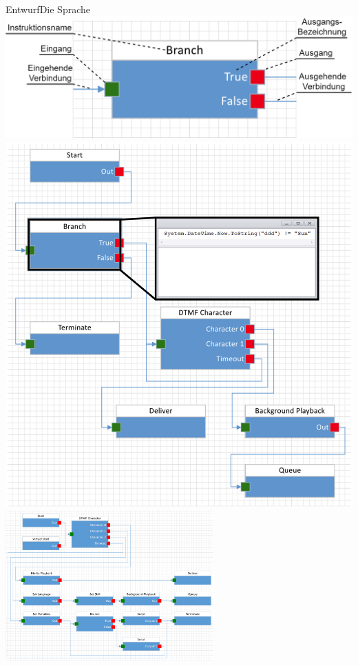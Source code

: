 \documentclass[t,aspectratio=169,divpsnames]{beamer}
\begin{document}
\begin{frame}{Entwurf}{Die Sprache}
	\only<1>
	{	
		\center
		\includegraphics[width=\textwidth]{img/SingleNodeWithAnnotations.png}
	}
	\only<2>
	{
		\center
		\includegraphics[scale=0.09]{img/ExampleFlowCodeHighlighted.png}
	}
	\only<3>
	{
		\center
		\includegraphics[width=0.6\textwidth]{img/TestRouting.png}
}
\end{frame}
\end{document}
